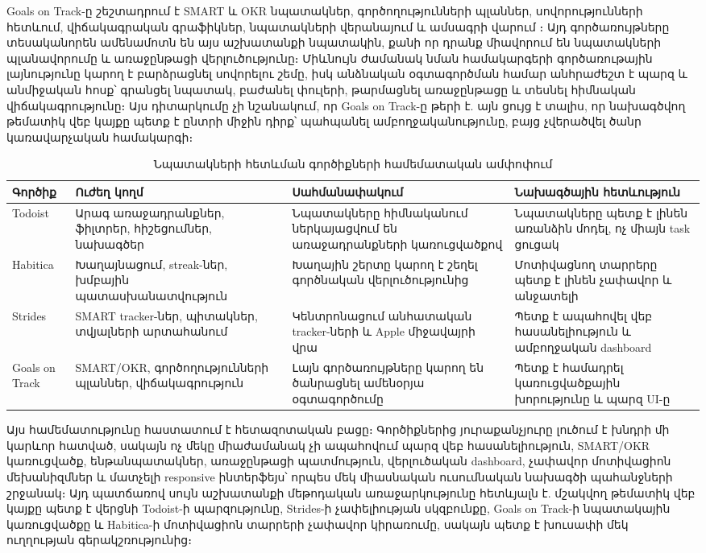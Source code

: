 Goals on Track-ը շեշտադրում է SMART և OKR նպատակներ, գործողությունների պլաններ, սովորությունների հետևում, վիճակագրական գրաֆիկներ, նպատակների վերանայում և ամսագրի վարում \autocite{goalsOnTrackFeatures}։ Այդ գործառույթները տեսականորեն ամենամոտն են այս աշխատանքի նպատակին, քանի որ դրանք միավորում են նպատակների պլանավորումը և առաջընթացի վերլուծությունը։ Միևնույն ժամանակ նման համակարգերի գործառութային լայնությունը կարող է բարձրացնել սովորելու շեմը, իսկ անձնական օգտագործման համար անհրաժեշտ է պարզ և անմիջական հոսք՝ գրանցել նպատակ, բաժանել փուլերի, թարմացնել առաջընթացը և տեսնել հիմնական վիճակագրությունը։ Այս դիտարկումը չի նշանակում, որ Goals on Track-ը թերի է. այն ցույց է տալիս, որ նախագծվող թեմատիկ վեբ կայքը պետք է ընտրի միջին դիրք՝ պահպանել ամբողջականությունը, բայց չվերածվել ծանր կառավարչական համակարգի։

\begin{table}[h]
\centering
\small
\begin{tabular}{p{2.4cm}p{3.2cm}p{3.6cm}p{4.2cm}}
\toprule
\textbf{Գործիք} & \textbf{Ուժեղ կողմ} & \textbf{Սահմանափակում} & \textbf{Նախագծային հետևություն} \\
\midrule
Todoist & Արագ առաջադրանքներ, ֆիլտրեր, հիշեցումներ, նախագծեր & Նպատակները հիմնականում ներկայացվում են առաջադրանքների կառուցվածքով & Նպատակները պետք է լինեն առանձին մոդել, ոչ միայն task ցուցակ \\
Habitica & Խաղայնացում, streak-ներ, խմբային պատասխանատվություն & Խաղային շերտը կարող է շեղել գործնական վերլուծությունից & Մոտիվացնող տարրերը պետք է լինեն չափավոր և անջատելի \\
Strides & SMART tracker-ներ, պիտակներ, տվյալների արտահանում & Կենտրոնացում անհատական tracker-ների և Apple միջավայրի վրա & Պետք է ապահովել վեբ հասանելիություն և ամբողջական dashboard \\
Goals on Track & SMART/OKR, գործողությունների պլաններ, վիճակագրություն & Լայն գործառույթները կարող են ծանրացնել ամենօրյա օգտագործումը & Պետք է համադրել կառուցվածքային խորությունը և պարզ UI-ը \\
\bottomrule
\end{tabular}
\caption{Նպատակների հետևման գործիքների համեմատական ամփոփում}
\end{table}

Այս համեմատությունը հաստատում է հետազոտական բացը։ Գործիքներից յուրաքանչյուրը լուծում է խնդրի մի կարևոր հատված, սակայն ոչ մեկը միաժամանակ չի ապահովում պարզ վեբ հասանելիություն, SMART/OKR կառուցվածք, ենթանպատակներ, առաջընթացի պատմություն, վերլուծական dashboard, չափավոր մոտիվացիոն մեխանիզմներ և մատչելի responsive ինտերֆեյս՝ որպես մեկ միասնական ուսումնական նախագծի պահանջների շրջանակ։ Այդ պատճառով սույն աշխատանքի մեթոդական առաջարկությունը հետևյալն է. մշակվող թեմատիկ վեբ կայքը պետք է վերցնի Todoist-ի պարզությունը, Strides-ի չափելիության սկզբունքը, Goals on Track-ի նպատակային կառուցվածքը և Habitica-ի մոտիվացիոն տարրերի չափավոր կիրառումը, սակայն պետք է խուսափի մեկ ուղղության գերակշռությունից։

